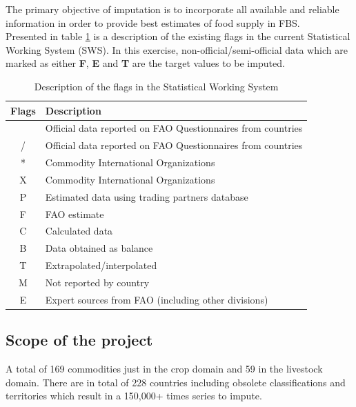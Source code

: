 \documentclass[nojss]{jss}\usepackage[]{graphicx}\usepackage[]{color}
\begin{document}
The primary objective of imputation is to incorporate all
available and reliable information in order to provide best estimates of
food supply in FBS.\\

Presented in table \ref{tab:swsflag} is a description of the existing
flags in the current Statistical Working System (SWS). In this
exercise, non-official/semi-official data which are marked as either
\textbf{F}, \textbf{E} and \textbf{T} are the target values to be
imputed.\\

\begin{table}[h!]
  \label{tab:swsflag}
  \caption{Description of the flags in the Statistical Working System}
  \begin{center}
    \begin{tabular}{|c||p{12cm}|}
      \hline
      Flags & Description\\
      \hline
      & Official data reported on FAO Questionnaires from countries\\
      / & Official data reported on FAO Questionnaires from countries\\
      * & Commodity International Organizations\\
      X & Commodity International Organizations\\
      P & Estimated data using trading partners database\\
      F & FAO estimate\\
      C & Calculated data\\
      B & Data obtained as balance\\
      T & Extrapolated/interpolated\\
      M & Not reported by country\\
      E & Expert sources from FAO (including other divisions)\\
      \hline
    \end{tabular}
  \end{center}  
\end{table}

\subsection{Scope of the project}
A total of 169 commodities just in the crop domain and 59 in the
livestock domain. There are in total of 228 countries including
obsolete classifications and territories which result in a 150,000+
times series to impute.\\
\end{document}
